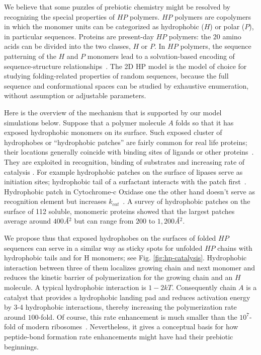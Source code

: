 \documentclass[journal=jacsat,manuscript=article,layout=twocolumn]{achemso}
\begin{document}
 We believe that some puzzles of prebiotic chemistry might be resolved by recognizing the 
 special properties of $HP$ polymers.  $HP$ polymers are copolymers in which the monomer units can 
be categorized as hydrophobic ($H$) or polar ($P$), in particular sequences.  Proteins are 
present-day $HP$ polymers: the 20 amino acids can be divided into the two classes, $H$ or $P$.  In 
$HP$ polymers, the sequence patterning of the $H$ and $P$ monomers lead to a solvation-based 
encoding of sequence-structure relationships~\cite{Chan1991}.  The 2D HP model is the model of 
choice for studying folding-related properties of random sequences, because the full sequence and 
conformational spaces can be studied by exhaustive enumeration, without assumption or adjustable 
parameters. 

   Here is the overview of the mechanism that is supported by our model simulations below.  
   Suppose that a polymer molecule $A$ folds so that it has exposed hydrophobic monomers on its 
surface.
Such exposed cluster of hydrophobes or ``hydrophobic patches'' are fairly common for real 
life proteins; their locations generally coincide with binding sites of ligands or other 
proteins~\cite{Lijnzaad1996}. They are exploited in recognition, binding of substrates 
and increasing rate of catalysis \cite{MitchellGuss1983,Lijnzaad1996,VanEe1997,Witt1998}. For 
example hydrophobic patches on the surface of lipases serve as initiation sites; 
hydrophobic tail of a surfactant interacts with the patch first~\cite{VanEe1997}. Hydrophobic 
patch 
in Cytochrome-c Oxidase one the other hand doesn't serve as recognition element but increases 
$k_{cat}$~\cite{Witt1998}. A survey of hydrophobic patches on the surface of 112 soluble, 
monomeric 
proteins\cite{Lijnzaad1996} showed that the largest patches average around $400$\textit{\AA}$^2$ 
but can range from $200$ to $1,200$\textit{\AA}$^2$.

 We propose thus that exposed hydrophobes on the surfaces of folded $HP$ sequences can serve in a 
similar way as sticky spots for unfolded $HP$ chains with hydrophobic tails and for H monomers; 
see 
Fig. \ref{fig:hp-catalysis}.  Hydrophobic interaction between three of them localizes growing 
chain 
and next monomer and reduces the kinetic barrier of polymerization for the growing chain and an 
$H$ 
molecule.  A typical hydrophobic interaction is $1-2kT$.  Consequently chain $A$ is a 
catalyst that provides a hydrophobic landing pad and reduces activation energy by 3-4 hydrophobic 
interactions, thereby increasing the polymerization rate around $ 100$-fold.  Of course, this rate 
enhancement is much smaller than the 
$10^7$-fold of modern ribosomes~\cite{Sievers2004a}. Nevertheless, it gives a conceptual basis for 
how peptide-bond formation rate enhancements might have had their prebiotic beginnings.  
\end{document}
